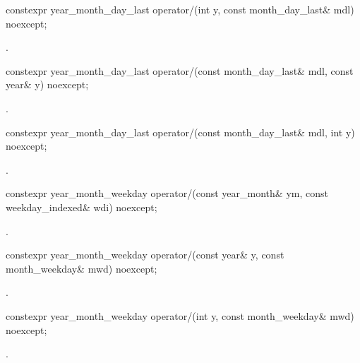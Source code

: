 \begin{itemdecl}
constexpr year_month_day_last
  operator/(int y, const month_day_last& mdl) noexcept;
\end{itemdecl}

\begin{itemdescr}
\pnum
\returns {}.
\end{itemdescr}

\begin{itemdecl}
constexpr year_month_day_last
  operator/(const month_day_last& mdl, const year& y) noexcept;
\end{itemdecl}

\begin{itemdescr}
\pnum
\returns {}.
\end{itemdescr}

\begin{itemdecl}
constexpr year_month_day_last
  operator/(const month_day_last& mdl, int y) noexcept;
\end{itemdecl}

\begin{itemdescr}
\pnum
\returns {}.
\end{itemdescr}

\begin{itemdecl}
constexpr year_month_weekday
  operator/(const year_month& ym, const weekday_indexed& wdi) noexcept;
\end{itemdecl}

\begin{itemdescr}
\pnum
\returns {}.
\end{itemdescr}

\begin{itemdecl}
constexpr year_month_weekday
  operator/(const year& y, const month_weekday& mwd) noexcept;
\end{itemdecl}

\begin{itemdescr}
\pnum
\returns {}.
\end{itemdescr}

\begin{itemdecl}
constexpr year_month_weekday
  operator/(int y, const month_weekday& mwd) noexcept;
\end{itemdecl}

\begin{itemdescr}
\pnum
\returns {}.
\end{itemdescr}

